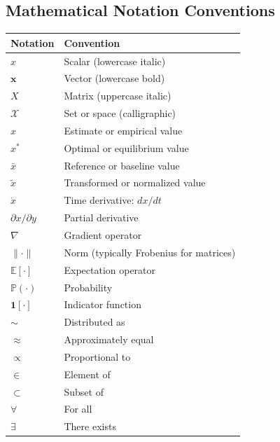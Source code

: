 \subsection{Mathematical Notation Conventions}

\begin{center}
\renewcommand{\arraystretch}{1.3}
\begin{tabular}{lp{10cm}}
\hline
\textbf{Notation} & \textbf{Convention} \\
\hline
$x$ & Scalar (lowercase italic) \\
$\mathbf{x}$ & Vector (lowercase bold) \\
$X$ & Matrix (uppercase italic) \\
$\mathcal{X}$ & Set or space (calligraphic) \\
$\hat{x}$ & Estimate or empirical value \\
$x^*$ & Optimal or equilibrium value \\
$\bar{x}$ & Reference or baseline value \\
$\tilde{x}$ & Transformed or normalized value \\
$\dot{x}$ & Time derivative: $dx/dt$ \\
$\partial x / \partial y$ & Partial derivative \\
$\nabla$ & Gradient operator \\
$\|\cdot\|$ & Norm (typically Frobenius for matrices) \\
$\mathbb{E}[\cdot]$ & Expectation operator \\
$\mathbb{P}(\cdot)$ & Probability \\
$\mathbf{1}[\cdot]$ & Indicator function \\
$\sim$ & Distributed as \\
$\approx$ & Approximately equal \\
$\propto$ & Proportional to \\
$\in$ & Element of \\
$\subset$ & Subset of \\
$\forall$ & For all \\
$\exists$ & There exists \\
\hline
\end{tabular}
\end{center}

